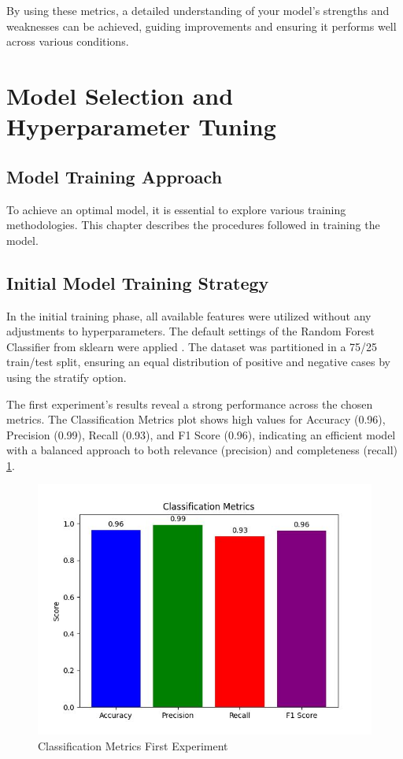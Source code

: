 \documentclass[3p,times,procedia]{elsarticle}
\begin{document}
By using these metrics, a detailed understanding of your model's strengths and weaknesses can be achieved, guiding improvements and ensuring it performs well across various conditions.

\section{Model Selection and Hyperparameter Tuning}

\subsection{Model Training Approach}

\quad To achieve an optimal model, it is essential to explore various training methodologies. This chapter describes the procedures followed in training the model.

\subsection{Initial Model Training Strategy}

\quad In the initial training phase, all available features were utilized without any adjustments to hyperparameters. The default settings of the Random Forest Classifier from sklearn were applied \cite{sklearn_api}. The dataset was partitioned in a 75/25 train/test split, ensuring an equal distribution of positive and negative cases by using the stratify option.

The first experiment's results reveal a strong performance across the chosen metrics. The Classification Metrics plot shows high values for Accuracy (0.96), Precision (0.99), Recall (0.93), and F1 Score (0.96), indicating an efficient model with a balanced approach to both relevance (precision) and completeness (recall) \ref{classificationMetricsFirstExperiment}.

\begin{figure}[htbp]
	\centering
		\includegraphics[scale=0.8]{./figures/metrics/experiment1English/classificationMetrics.jpg}
	\caption{Classification Metrics First Experiment}
	\label{classificationMetricsFirstExperiment}
\end{figure}
\end{document}
